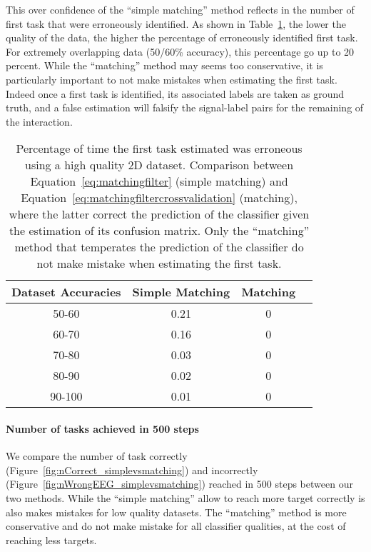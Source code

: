 This over confidence of the ``simple matching'' method reflects in the number of first task that were erroneously identified. As shown in Table~\ref{tab:errorTaskRatiosimplevsmatching}, the lower the quality of the data, the higher the percentage of erroneously identified first task. For extremely overlapping data (50/60\% accuracy), this percentage go up to 20 percent. While the ``matching'' method may seems too conservative, it is particularly important to not make mistakes when estimating the first task. Indeed once a first task is identified, its associated labels are taken as ground truth, and a false estimation will falsify the signal-label pairs for the remaining of the interaction.

\begin{table}[!ht]
\centering
{}
\begin{tabular}{c c c c}
    Dataset Accuracies & Simple Matching &  Matching \\ \hline
    50-60 & 0.21 & 0 \\ 
    60-70 & 0.16 & 0 \\
    70-80 & 0.03 & 0 \\
    80-90 & 0.02 & 0 \\
    90-100 & 0.01 & 0 \\
\end{tabular}
\caption{Percentage of time the first task estimated was erroneous using a high quality 2D dataset. Comparison between Equation~\ref{eq:matchingfilter} (simple matching) and Equation~\ref{eq:matchingfiltercrossvalidation} (matching), where the latter correct the prediction of the classifier given the estimation of its confusion matrix. Only the ``matching'' method that temperates the prediction of the classifier do not make mistake when estimating the first task.}
\label{tab:errorTaskRatiosimplevsmatching}
\end{table}

\paragraph{Number of tasks achieved in 500 steps}

We compare the number of task correctly (Figure~\ref{fig:nCorrect_simplevsmatching}) and incorrectly (Figure~\ref{fig:nWrongEEG_simplevsmatching}) reached in 500 steps between our two methods. While the ``simple matching'' allow to reach more target correctly is also makes mistakes for low quality datasets. The ``matching'' method is more conservative and do not make mistake for all classifier qualities, at the cost of reaching less targets.

